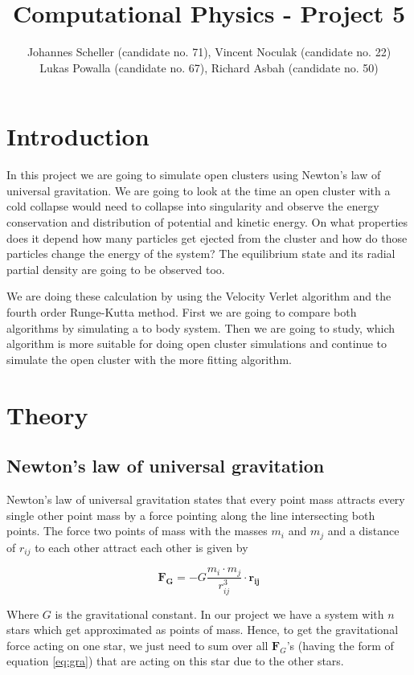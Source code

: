 \documentclass[10pt,a4paper]{article}
\author{Johannes Scheller (candidate no. 71), Vincent Noculak (candidate no. 22)\\ Lukas Powalla (candidate no. 67), Richard Asbah (candidate no. 50) }
\title{Computational Physics - Project 5}
\begin{document}
\maketitle
\newpage
\tableofcontents
\newpage

\section{Introduction}

In this project we are going to simulate open clusters using Newton's law of universal gravitation. We are going to look at the time an open cluster with a cold collapse would need to collapse into singularity and observe the energy conservation and distribution of potential and kinetic energy. On what properties does it depend how many particles get ejected from the cluster and how do those particles change the energy of the system? The equilibrium state and its radial partial density are going to be observed too.

We are doing these calculation by using the Velocity Verlet algorithm and the fourth order Runge-Kutta method. First we are going to compare both algorithms by simulating a to body system. Then we are going to study, which algorithm is more suitable for doing open cluster simulations and continue to simulate the open cluster with the more fitting algorithm.

\section{Theory}

\subsection{Newton's law of universal gravitation}

Newton's law of universal gravitation states that every point mass attracts every single other point mass by a force pointing along the line intersecting both points. The force two points of mass with the masses $m_i$ and $m_j$ and a distance of $r_{ij}$ to each other attract each other is given by

\begin{equation}	
\label{eq:gra}
\mathbf{F_G} = - G \frac{m_i \cdot m_j}{r_{ij}^3} \cdot \mathbf{r_{ij}}
\end{equation}

Where $G$ is the gravitational constant. In our project we have a system with $n$ stars which get approximated as points of mass. Hence, to get the gravitational force acting on one star, we just need to sum over all $\mathbf{F}_G$'s (having the form of equation \eqref{eq:gra}) that are acting on this star due to the other stars.
\end{document}
